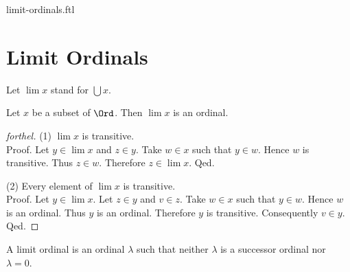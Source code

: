 \documentclass{naproche-library}
\begin{document}
\begin{smodule}{limit-ordinals.ftl}

  \section*{Limit Ordinals}

  \begin{forthel}
    Let $\lim x$ stand for $\bigcup x$.
  \end{forthel}

  \begin{proposition}[forthel,id=SET_THEORY_02_7202164443185152]
    Let $x$ be a subset of $\Ord$.
    Then $\lim x$ is an ordinal.
  \end{proposition}
  \begin{proof}[forthel]
    (1) $\lim x$ is transitive. \\
    Proof.
      Let $y \in \lim x$ and $z \in y$.
      Take $w \in x$ such that $y \in w$.
      Hence $w$ is transitive.
      Thus $z \in w$.
      Therefore $z \in \lim x$.
    Qed.

    (2) Every element of $\lim x$ is transitive. \\
    Proof.
      Let $y \in \lim x$.
      Let $z \in y$ and $v \in z$.
      Take $w \in x$ such that $y \in w$.
      Hence $w$ is an ordinal.
      Thus $y$ is an ordinal.
      Therefore $y$ is transitive.
      Consequently $v \in y$.
    Qed.
  \end{proof}

  \begin{definition}[forthel,id=SET_THEORY_02_7678388934279168]
    A limit ordinal is an ordinal $\lambda$ such that neither $\lambda$ is a successor ordinal nor $\lambda = 0$.
  \end{definition}
\end{smodule}
\end{document}
